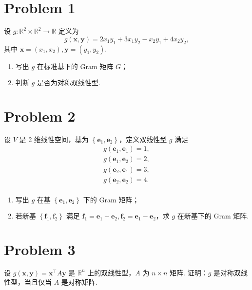 \section*{Problem 1}

设 $g : \mathbb{R}^2 \times \mathbb{R}^2 \to \mathbb{R}$ 定义为
\[
g \left(\boldsymbol{x}, \boldsymbol{y}\right) = 2 x_1 y_1 + 3 x_1 y_2 - x_2 y_1 + 4 x_2 y_2,
\]
其中 $\boldsymbol{x} = \left(x_1, x_2\right), \boldsymbol{y} = \left(y_1, y_2\right)$.
\begin{enumerate}
    \item 写出 $g$ 在标准基下的 Gram 矩阵 $G$；
    \item 判断 $g$ 是否为对称双线性型.
\end{enumerate}

\section*{Problem 2}

设 $V$ 是 2 维线性空间，基为 $\left\{\boldsymbol{e}_1, \boldsymbol{e}_2\right\}$，定义双线性型 $g$ 满足
\[
\begin{aligned}
g \left(\boldsymbol{e}_1, \boldsymbol{e}_1\right) = 1, \\
g \left(\boldsymbol{e}_1, \boldsymbol{e}_2\right) = 2, \\
g \left(\boldsymbol{e}_2, \boldsymbol{e}_1\right) = 3, \\
g \left(\boldsymbol{e}_2, \boldsymbol{e}_2\right) = 4. \\
\end{aligned}
\]
\begin{enumerate}
    \item 写出 $g$ 在基 $\left\{\boldsymbol{e}_1, \boldsymbol{e}_2\right\}$ 下的 Gram 矩阵；
    \item 若新基 $\left\{\boldsymbol{f}_1, \boldsymbol{f}_2\right\}$ 满足 $\boldsymbol{f}_1 = \boldsymbol{e}_1 + \boldsymbol{e}_2, \boldsymbol{f}_2 = \boldsymbol{e}_1 - \boldsymbol{e}_2$，求 $g$ 在新基下的 Gram 矩阵.
\end{enumerate}

\section*{Problem 3}

设 $g \left(\boldsymbol{x}, \boldsymbol{y}\right) = \boldsymbol{x}^\top A \boldsymbol{y}$ 是 $\mathbb{R}^n$ 上的双线性型，$A$ 为 $n \times n$ 矩阵. 证明：$g$ 是对称双线性型，当且仅当 $A$ 是对称矩阵.
